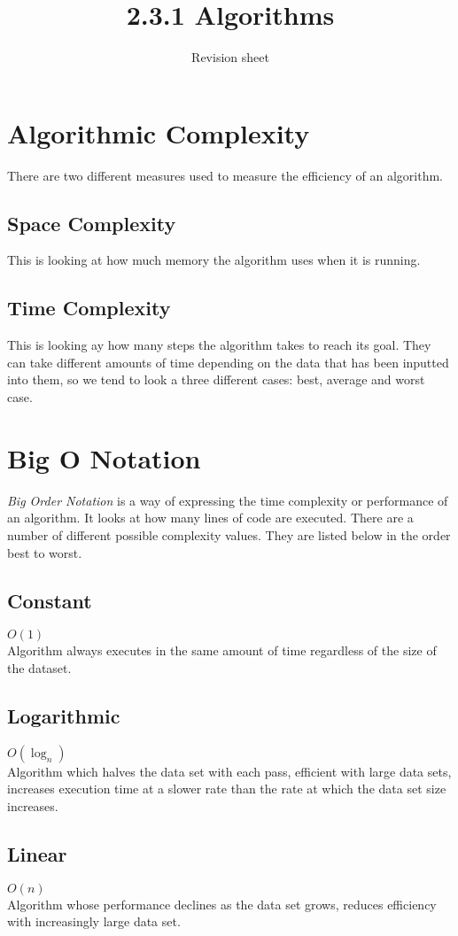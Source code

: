 \documentclass[a4paper,11pt]{article}
\title{2.3.1 Algorithms}
\author{Revision sheet}
\date{}
\begin{document}
\maketitle
\thispagestyle{fancy}

\section{Algorithmic Complexity}
There are two different measures used to measure the efficiency of an algorithm.
\subsection{Space Complexity}
This is looking at how much memory the algorithm uses when it is running.
\subsection{Time Complexity}
This is looking ay how many steps the algorithm takes to reach its goal. They can take different amounts of time depending on the data that has been inputted into them, so we tend to look a three different cases: best, average and worst case.

\section{Big O Notation}
\textit{Big Order Notation} is a way of expressing the time complexity or performance of an algorithm. It looks at how many lines of code are executed. There are a number of different possible complexity values. They are listed below in the order best to worst. 
\subsection{Constant}
$O(1)$\\
Algorithm always executes in the same amount of time regardless of the size of the dataset.
\subsection{Logarithmic}
$O(\log_n)$\\
Algorithm which halves the data set with each pass, efficient with large data sets, increases execution time at a slower rate than the rate at which the data set size increases.
\subsection{Linear}
$O(n)$\\
Algorithm whose performance declines as the data set grows, reduces efficiency with increasingly large data set.
\end{document}

